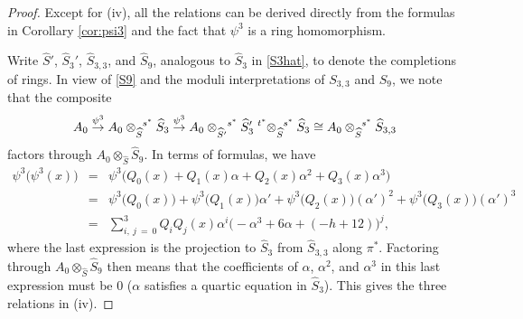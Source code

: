 \documentclass{gtpart}
\theoremstyle{definition}
\theoremstyle{remark}
\newcommand{\HS}{\widehat{S}}
\newcommand{\A}{\alpha}
\newcommand{\p}{\psi^3}
\begin{document}
\begin{proof}
 Except for (iv), all the relations can be derived directly from the formulas in Corollary \ref{cor:psi3} and the fact that $\p$ is a ring homomorphism.  

 Write $\HS'$, $\HS_3'$, $\HS_{3,3}$, and $\HS_9$, analogous to $\HS_3$ in \eqref{S3hat}, to denote the completions of rings.  
 In view of \eqref{S9} and the moduli interpretations of $S_{3,3}$ and $S_9$, we note that the composite 
 \[
  A_0 \stackrel{\p}{\to} A_0 \tensor[]{\otimes}{_{\HS}^{s^*}} \HS_3 
  \stackrel{\p}{\to} A_0 \tensor[]{\otimes}{_{\HS'}^{s^*}} \HS_3' \tensor[^{t^*}]{\otimes}{_{\HS}^{s^*}} \HS_3 
  \cong A_0 \tensor[]{\otimes}{_{\HS}^{s^*}} \HS_{3,3} 
 \]
 factors through $A_0 \otimes_{\HS} \HS_9$.  In terms of formulas, we have 
 \begin{eqnarray*}
  \p \big( \p(x) \big) & = & \p \big( Q_0(x) + Q_1(x) \A + Q_2(x) \A^2 + Q_3(x) \A^3 \big) \\
                       & = & \p \big( Q_0(x) \big) + \p \big( Q_1(x) \big) \A' + \p \big( Q_2(x) \big) (\A')^2 + \p \big( Q_3(x) \big) (\A')^3 \\
                       & = & \sum_{i,~j~=~0}^3 Q_iQ_j(x) \A^i \big( -\A^3 + 6 \A + (-h + 12) \big)^j, 
 \end{eqnarray*}
 where the last expression is the projection to $\HS_3$ from $\HS_{3,3}$ along $\pi^*$.  
 Factoring through $A_0 \otimes_{\HS} \HS_9$ then means that the coefficients of $\A$, $\A^2$, and $\A^3$ in this last expression must be 0 
 ($\A$ satisfies a quartic equation in $\HS_3$).  This gives the three relations in (iv).
\end{proof}
\end{document}

